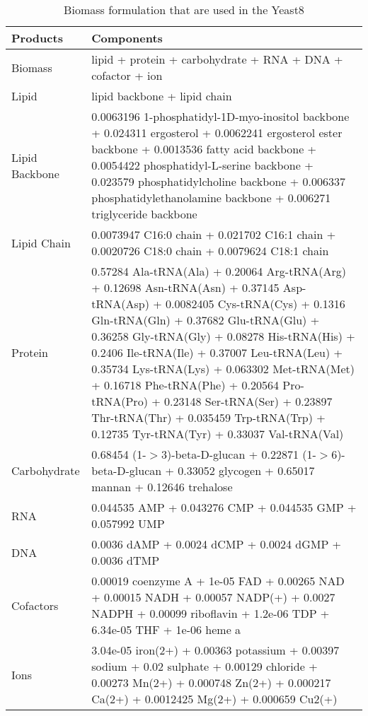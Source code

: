 \begin{table}[H]
\small
\caption[Biomass coefficients]{Biomass formulation that are used in the Yeast8}
\begin{center}
  \begin{tabular}{p{3cm}p{11.5cm}}
  \hline
  \textbf{Products} & \textbf{Components} \\ \hline
  Biomass      & lipid + protein + carbohydrate + RNA + DNA + cofactor + ion \\ \hline
    Lipid   & lipid backbone + lipid chain \\ \hline
  Lipid Backbone  & 0.0063196 1-phosphatidyl-1D-myo-inositol backbone +
  0.024311 ergosterol + 0.0062241 ergosterol ester backbone  +
  0.0013536 fatty acid backbone +
  0.0054422 phosphatidyl-L-serine backbone +
  0.023579 phosphatidylcholine backbone  +
  0.006337 phosphatidylethanolamine backbone +
  0.006271 triglyceride backbone \\ \hline
  Lipid Chain  & 0.0073947 C16:0 chain +
  0.021702 C16:1 chain +
  0.0020726 C18:0 chain +
  0.0079624 C18:1 chain \\ \hline
  Protein      & 0.57284 Ala-tRNA(Ala) +
  0.20064 Arg-tRNA(Arg) +
  0.12698 Asn-tRNA(Asn) +
  0.37145 Asp-tRNA(Asp) +
  0.0082405 Cys-tRNA(Cys) +
  0.1316 Gln-tRNA(Gln) +
  0.37682 Glu-tRNA(Glu) +
  0.36258 Gly-tRNA(Gly) +
  0.08278 His-tRNA(His) +
  0.2406 Ile-tRNA(Ile) +
  0.37007 Leu-tRNA(Leu) +
  0.35734 Lys-tRNA(Lys) +
  0.063302 Met-tRNA(Met) +
  0.16718 Phe-tRNA(Phe) +
  0.20564 Pro-tRNA(Pro) +
  0.23148 Ser-tRNA(Ser) +
  0.23897 Thr-tRNA(Thr) +
  0.035459 Trp-tRNA(Trp) +
  0.12735 Tyr-tRNA(Tyr) +
  0.33037 Val-tRNA(Val) \\ \hline
  Carbohydrate   & 0.68454 (1-$>$3)-beta-D-glucan +
  0.22871 (1-$>$6)-beta-D-glucan +
  0.33052 glycogen +
  0.65017 mannan +
  0.12646 trehalose \\ \hline
  RNA   & 0.044535 AMP +
  0.043276 CMP +
  0.044535 GMP +
  0.057992 UMP \\ \hline
  DNA   & 0.0036 dAMP +
  0.0024 dCMP +
  0.0024 dGMP +
  0.0036 dTMP \\ \hline
  Cofactors   & 0.00019 coenzyme A +
  1e-05 FAD +
  0.00265 NAD +
  0.00015 NADH +
  0.00057 NADP(+) +
  0.0027 NADPH +
  0.00099 riboflavin +
  1.2e-06 TDP +
  6.34e-05 THF +
  1e-06 heme a \\ \hline
  Ions   & 3.04e-05 iron(2+) +
  0.00363 potassium +
  0.00397 sodium +
  0.02 sulphate +
  0.00129 chloride +
  0.00273 Mn(2+)  +
  0.000748 Zn(2+) +
  0.000217 Ca(2+) +
  0.0012425 Mg(2+) +
  0.000659 Cu2(+) \\ \hline

  \end{tabular}
\label{table:biomass_coefficients}
\end{center}
\end{table}
